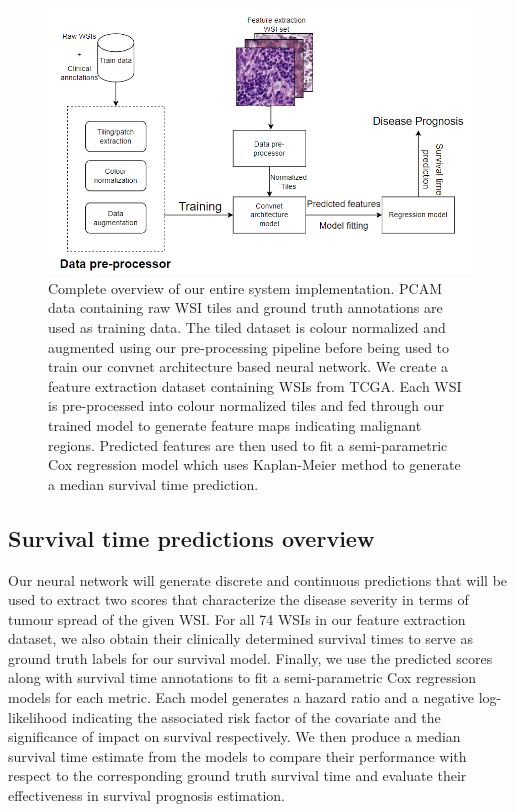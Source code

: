 \documentclass{l4proj}
\begin{document}
\begin{figure}[H]
    \centering
    \includegraphics[scale=0.7]{images/implementation-overview.png}
    \caption{Complete overview of our entire system implementation. PCAM data containing raw WSI tiles and ground truth annotations are used as training data. The tiled dataset is colour normalized and augmented using our pre-processing pipeline before being used to train our convnet architecture based neural network. We create a feature extraction dataset containing WSIs from TCGA. Each WSI is pre-processed into colour normalized tiles and fed through our trained model to generate feature maps indicating malignant regions. Predicted features are then used to fit a semi-parametric Cox regression model which uses Kaplan-Meier method to generate a median survival time prediction.}
    \label{fig:implementation-overview}
\end{figure}

\subsection{Survival time predictions overview}
Our neural network will generate discrete and continuous predictions that will be used to extract two scores that characterize the disease severity in terms of tumour spread of the given WSI. For all 74 WSIs in our feature extraction dataset, we also obtain their clinically determined survival times to serve as ground truth labels for our survival model. Finally, we use the predicted scores along with survival time annotations to fit a semi-parametric Cox regression models for each metric. Each model generates a hazard ratio and a negative log-likelihood indicating the associated risk factor of the covariate and the significance of impact on survival respectively. We then produce a median survival time estimate from the models to compare their performance with respect to the corresponding ground truth survival time and evaluate their effectiveness in survival prognosis estimation.
\end{document}
